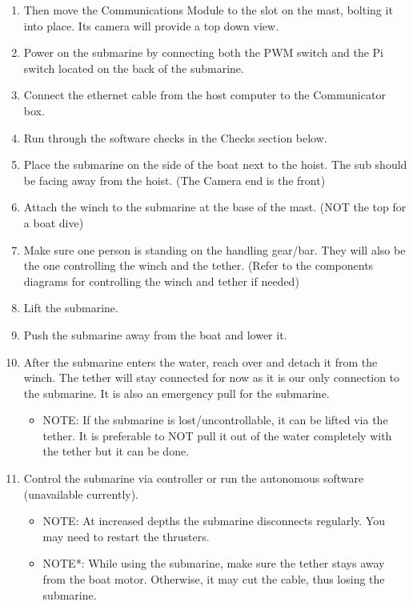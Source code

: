 \documentclass[
18pt, %
a4paper, %
oneside, %
headinclude,footinclude, %
]{scrartcl}
\begin{document}
\begin{enumerate}
\begin{itemize}
	\end{itemize}
	\item Then move the Communications Module to the slot on the mast, bolting it into place. Its camera will provide a top down view.	
	\item Power on the submarine by connecting both the PWM switch and the Pi switch located on the back of the submarine.
	\item Connect the ethernet cable from the host computer to the Communicator box. 	
	\item Run through the software checks in the Checks section below.	
	\item Place the submarine on the side of the boat next to the hoist. The sub should be facing away from the hoist. (The Camera end is the front)	
	\item Attach the winch to the submarine at the base of the mast. (NOT the top for a boat dive) 
	\item Make sure one person is standing on the handling gear/bar. They will also be the one controlling the winch and the tether. (Refer to the components diagrams for controlling the winch and tether if needed)
	\item Lift the submarine.
	\item Push the submarine away from the boat and lower it.
	\item After the submarine enters the water, reach over and detach it from the winch. The tether will stay connected for now as it is our only connection to the submarine. It is also an emergency pull for the submarine.
	\begin{itemize}
		\item NOTE: If the submarine is lost/uncontrollable, it can be lifted via the tether. It is preferable to NOT pull it out of the water completely with the tether but it can be done.	
	\end{itemize}
	\item Control the submarine via controller or run the autonomous software (unavailable currently). 
		\begin{itemize}
		\item NOTE: At increased depths the submarine disconnects regularly. You may need to restart the thrusters.
		\item NOTE*: While using the submarine, make sure the tether stays away from the boat motor. Otherwise, it may cut the cable, thus losing the submarine.
	\end{itemize}
\end{enumerate}
\end{document}
